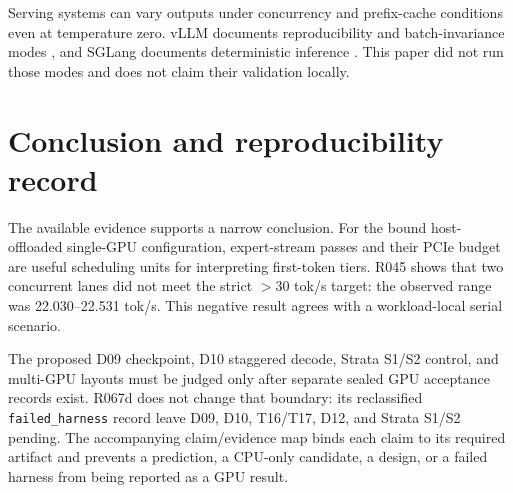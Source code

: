 \documentclass[11pt]{article}
\begin{document}
Serving systems can vary outputs under concurrency and prefix-cache conditions even at temperature zero. vLLM documents reproducibility and batch-invariance modes \cite{vllmrepro,vllmbatch}, and SGLang documents deterministic inference \cite{sglang}. This paper did not run those modes and does not claim their validation locally.

\section{Conclusion and reproducibility record}

The available evidence supports a narrow conclusion. For the bound host-offloaded single-GPU configuration, expert-stream passes and their PCIe budget are useful scheduling units for interpreting first-token tiers. R045 shows that two concurrent lanes did not meet the strict $>30$ tok/s target: the observed range was 22.030--22.531 tok/s. This negative result agrees with a workload-local serial scenario.

The proposed D09 checkpoint, D10 staggered decode, Strata S1/S2 control, and multi-GPU layouts must be judged only after separate sealed GPU acceptance records exist. R067d does not change that boundary: its reclassified \texttt{failed\_harness} record leave D09, D10, T16/T17, D12, and Strata S1/S2 pending. The accompanying claim/evidence map binds each claim to its required artifact and prevents a prediction, a CPU-only candidate, a design, or a failed harness from being reported as a GPU result.



\end{document}
